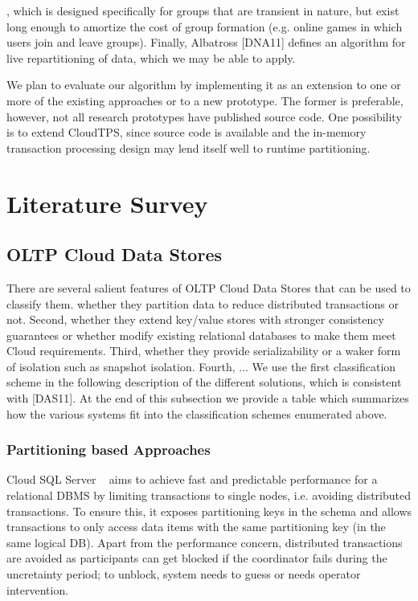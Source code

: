 \documentclass[10pt,final,journal]{IEEEtran}
\begin{document}
, which is designed specifically for groups that are transient in nature, but exist long enough to amortize the cost of group formation (e.g. online games in which users join and leave groups).  Finally, Albatross [DNA11] defines an algorithm for live repartitioning of data, which we may be able to apply.

We plan to evaluate our algorithm by implementing it as an extension to one or more of the existing approaches or to a new prototype. The former is preferable, however, not all research prototypes have published source code. One possibility is to extend CloudTPS, since source code is available and the in-memory transaction processing design may lend itself well to runtime partitioning.

\section{Literature Survey}

\subsection{OLTP Cloud Data Stores}
There are several salient features of OLTP Cloud Data Stores that can be used to classify them. whether they partition data to reduce distributed transactions or not. Second, whether they extend key/value stores with stronger consistency guarantees or whether modify existing relational databases to make them meet Cloud requirements. Third, whether they provide serializability or a waker form of isolation such as snapshot isolation. Fourth, ... We use the first classification scheme in the following description of the different solutions, which is consistent with [DAS11]. At the end of this subsection we provide a table which summarizes how the various systems fit into the classification schemes enumerated above.

\subsubsection{Partitioning based Approaches}
Cloud SQL Server ~\cite{Campbell:2010:ESF:1807167.1807280, Bernstein:2011:AMS:2004686.2005651} aims to achieve fast and predictable performance for a relational DBMS by limiting transactions to single nodes, i.e. avoiding distributed transactions. To ensure this, it exposes partitioning keys in the schema and allows transactions to only access data items with the same partitioning key (in the same logical DB). Apart from the performance concern, distributed transactions are avoided as participants can get blocked if the coordinator fails during the uncretainty period; to unblock, system needs to guess or needs operator intervention.
\end{document}
